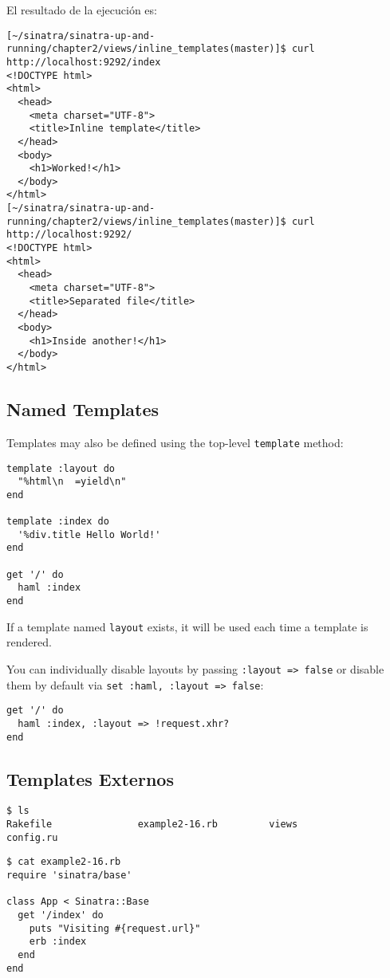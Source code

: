 El resultado de la ejecución es:
\begin{verbatim}
[~/sinatra/sinatra-up-and-running/chapter2/views/inline_templates(master)]$ curl http://localhost:9292/index
<!DOCTYPE html>
<html> 
  <head>
    <meta charset="UTF-8">
    <title>Inline template</title> 
  </head>
  <body> 
    <h1>Worked!</h1>
  </body> 
</html>
[~/sinatra/sinatra-up-and-running/chapter2/views/inline_templates(master)]$ curl http://localhost:9292/
<!DOCTYPE html>
<html> 
  <head>
    <meta charset="UTF-8">
    <title>Separated file</title> 
  </head>
  <body> 
    <h1>Inside another!</h1>
  </body> 
</html>
\end{verbatim}

\subsection{Named Templates}
Templates may also be defined using the top-level \verb|template| method:

\begin{verbatim}
template :layout do
  "%html\n  =yield\n"
end

template :index do
  '%div.title Hello World!'
end

get '/' do
  haml :index
end
\end{verbatim}
If a template named \verb|layout| exists, it will be used each time a template is rendered. 

You can individually disable layouts by passing \verb|:layout => false| or disable them by default via \verb|set :haml, :layout => false|:

\begin{verbatim}
get '/' do
  haml :index, :layout => !request.xhr?
end
\end{verbatim}

\subsection{Templates Externos}

\begin{verbatim}
$ ls
Rakefile               example2-16.rb         views
config.ru              
\end{verbatim}

\begin{verbatim}
$ cat example2-16.rb 
require 'sinatra/base'

class App < Sinatra::Base
  get '/index' do 
    puts "Visiting #{request.url}"
    erb :index
  end
end
\end{verbatim}

